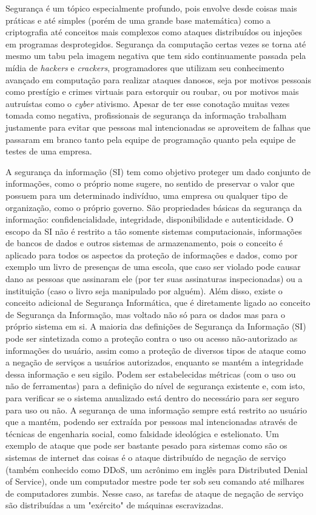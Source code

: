  Segurança é um tópico especialmente profundo, pois envolve desde coisas mais práticas e até simples (porém de uma grande base matemática) como a criptografia até conceitos mais complexos como ataques distribuídos ou injeções em programas desprotegidos. Segurança da computação certas vezes se torna até mesmo um tabu pela imagem negativa que tem sido continuamente passada pela mídia de \textit{hackers} e \textit{crackers}, programadores que utilizam seu conhecimento avançado em computação para realizar ataques danosos, seja por motivos pessoais como prestígio e crimes virtuais para estorquir ou roubar, ou por motivos mais autruístas como o \textit{cyber} ativismo. Apesar de ter esse conotação muitas vezes tomada como negativa, profissionais de segurança da informação trabalham justamente para evitar que pessoas mal intencionadas se aproveitem de falhas que passaram em branco tanto pela equipe de programação quanto pela equipe de testes de uma empresa.

A segurança da informação (SI) tem como objetivo proteger um dado conjunto de informações, como o próprio nome sugere, no sentido de preservar o valor que possuem para um determinado indivíduo, uma empresa ou qualquer tipo de organização, como o próprio governo. São propriedades básicas da segurança da informação: confidencialidade, integridade, disponibilidade e autenticidade. O escopo da SI não é restrito a tão somente sistemas computacionais, informações de bancos de dados e outros sistemas de armazenamento, pois o conceito é aplicado para todos os aspectos da proteção de informações e dados, como por exemplo um livro de presenças de uma escola, que caso ser violado pode causar dano as pessoas que assinaram ele (por ter suas assinaturas inspecionadas) ou a instituição (caso o livro seja manipulado por alguém). Além disso, existe o conceito adicional de Segurança Informática, que é diretamente ligado ao conceito de Segurança da Informação, mas voltado não só para os dados mas para o próprio sistema em si.
A maioria das definições de Segurança da Informação (SI) pode ser sintetizada como a proteção contra o uso ou acesso não-autorizado as informações do usuário, assim como a proteção de diversos tipos de ataque como a negação de serviços a usuários autorizados, enquanto se mantém a integridade dessa informação e seu sigilo. Podem ser estabelecidas métricas (com o uso ou não de ferramentas) para a definição do nível de segurança existente e, com isto, para verificar se o sistema anualizado está dentro do necessário para ser seguro para uso ou não. A segurança de uma informação sempre está restrito ao usuário que a mantém, podendo ser extraída por pessoas mal intencionadas através de técnicas de engenharia social, como falsidade ideológica e estelionato. Um exemplo de ataque que pode ser bastante pesado para sistemas como são os sistemas de internet das coisas é o ataque distribuído de negação de serviço (também conhecido como DDoS, um acrônimo em inglês para Distributed Denial of Service), onde um computador mestre pode ter sob seu comando até milhares de computadores zumbis. Nesse caso, as tarefas de ataque de negação de serviço são distribuídas a um "exército" de máquinas escravizadas.

